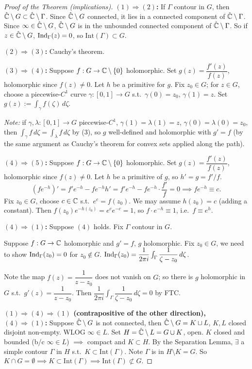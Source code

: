 \documentclass[11pt]{article}
\begin{document}
\begin{proof}[Proof of the Theorem (implications)]

\textbf{$(1)\Rightarrow(2)$:} If $\Gamma$ contour in $G$, then $\hat{{\mathbb{C}}}\setminus G \subset \hat{{\mathbb{C}}}\setminus\Gamma$. Since $\hat{{\mathbb{C}}}\setminus G$ connected, it lies in a connected component of $\hat{{\mathbb{C}}}\setminus\Gamma$. Since $\infty\in\hat{{\mathbb{C}}}\setminus G$, $\hat{{\mathbb{C}}}\setminus G$ is in the unbounded connected component of $\hat{{\mathbb{C}}}\setminus\Gamma$. So if $z\in\hat{{\mathbb{C}}}\setminus G$, $\operatorname{Ind}_\Gamma(z)=0$, so $\mathrm{Int}(\Gamma)\subset G$.

\textbf{$(2)\Rightarrow(3)$:} Cauchy's theorem.

\textbf{$(3)\Rightarrow(4)$:} Suppose $f:G\to{\mathbb{C}}\setminus\{0\}$ holomorphic. Set $g(z) = \dfrac{f'(z)}{f(z)}$, holomorphic since $f(z)\ne0$. Let $h$ be a primitive for $g$. Fix $z_0\in G$; for $z\in G$, choose a piecewise-$C^1$ curve $\gamma:[0,1]\to G$ s.t.\ $\gamma(0)=z_0$, $\gamma(1)=z$. Set $g(z) := \int_\gamma f(\zeta)\,d\zeta$.

\emph{Note:} if $\gamma,\lambda:[0,1]\to G$ piecewise-$C^1$, $\gamma(1)=\lambda(1)=z$, $\gamma(0)=\lambda(0)=z_0$, then $\int_\gamma f\,d\zeta = \int_\lambda f\,d\zeta$ by (3), so $g$ well-defined and holomorphic with $g'=f$ (by the same argument as Cauchy's theorem for convex sets applied along the path).

\textbf{$(4)\Rightarrow(5)$:} Suppose $f:G\to{\mathbb{C}}\setminus\{0\}$ holomorphic. Set $g(z) = \dfrac{f'(z)}{f(z)}$, holomorphic since $f(z)\ne0$. Let $h$ be a primitive of $g$, so $h'=g=f'/f$.
\[
\left(fe^{-h}\right)' = f'e^{-h} - fe^{-h}h' = f'e^{-h}-fe^{-h}\cdot\frac{f'}{f} = 0 \implies fe^{-h}\equiv c.
\]
Fix $z_0\in G$, choose $c\in{\mathbb{C}}$ s.t.\ $e^c=f(z_0)$. We may assume $h(z_0)=c$ (adding a constant). Then $f(z_0)e^{-h(z_0)} = e^ce^{-c}=1$, so $f\cdot e^{-h}\equiv1$, i.e.\ $f\equiv e^h$.

\textbf{$(4)\Rightarrow(1)$:} Suppose $(4)$ holds. Fix $\Gamma$ contour in $G$.

Suppose $f:G\to{\mathbb{C}}$ holomorphic and $g'=f$, $g$ holomorphic. Fix $z_0\in G$, we need to show $\operatorname{Ind}_\Gamma(z_0)=0$ for $z_0\notin G$. $\operatorname{Ind}_\Gamma(z_0) = \dfrac{1}{2\pi i}\int_\Gamma \dfrac{1}{\zeta-z_0}\,d\zeta$.

Note the map $f(z) = \dfrac{1}{z-z_0}$ does not vanish on $G$; so there is $g$ holomorphic in $G$ s.t.\ $g'(z) = \dfrac{1}{z-z_0}$. Then $\dfrac{1}{2\pi i}\int_\Gamma \dfrac{1}{\zeta-z_0}\,d\zeta = 0$ by FTC.

\textbf{$(1)\Rightarrow(4)\Rightarrow(1)$ (contrapositive of the other direction), $(4)\Rightarrow(1)$:} Suppose $\hat{{\mathbb{C}}}\setminus G$ is not connected, then $\hat{{\mathbb{C}}}\setminus G = K\sqcup L$, $K,L$ closed disjoint non-empty. WLOG $\infty\in L$. Set $H=\hat{{\mathbb{C}}}\setminus L = G\cup K$, open. $K$ closed and bounded (b/c $\infty\in L$) $\implies$ compact and $K\subset H$. By the Separation Lemma, $\exists$ a simple contour $\Gamma$ in $H$ s.t.\ $K\subset\mathrm{Int}(\Gamma)$. Note $\Gamma$ is in $H\setminus K = G$. So $K\cap G = \emptyset \implies K \subset \mathrm{Int}(\Gamma) \implies \mathrm{Int}(\Gamma)\not\subset G$.
\end{proof}
\end{document}
